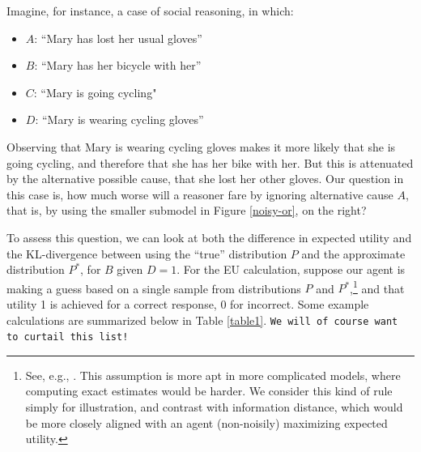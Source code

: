 \documentclass[10pt,letterpaper]{article}
\begin{document}
Imagine, for instance, a case of social reasoning, in which: \begin{itemize} \item[] $A$: ``Mary has lost her usual gloves'' \item[] $B$: ``Mary has her bicycle with her''  \item[] $C$: ``Mary is going cycling"  \item[] $D$:  ``Mary is wearing cycling gloves'' \end{itemize}
Observing that Mary is wearing cycling gloves makes it more likely that she is going cycling, and therefore that she has her bike with her. But this is attenuated by the alternative possible cause, that she lost her other gloves. Our question in this case is, how much worse will a reasoner fare by ignoring alternative cause $A$, that is, by using the smaller submodel  in Figure \ref{noisy-or}, on the right?

To assess this question, we can look at both the difference in expected utility and the KL-divergence between using the ``true'' distribution $P$ and the approximate distribution $P^*$, for $B$ given $D=1$. For the EU calculation, suppose our agent is making a guess based on a single sample from distributions $P$ and $P^*$,\footnote{See, e.g., \citep{Vul2014}. This assumption is more apt in more complicated models, where computing exact estimates would be harder. We consider this kind of rule simply for illustration, and contrast with information distance, which would be more closely aligned with an agent (non-noisily) maximizing expected utility.} and that utility 1 is achieved for a correct response, 0 for incorrect. Some example calculations are summarized below in Table \ref{table1}. \texttt{We will of course want to curtail this list!}
\end{document}
